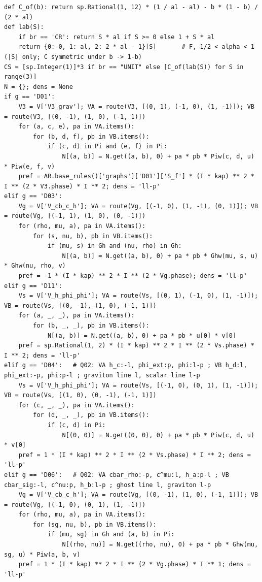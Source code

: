 \documentclass[10pt]{article}
\begin{document}
\begin{lstlisting}
def C_of(b): return sp.Rational(1, 12) * (1 / al - al) - b * (1 - b) / (2 * al)
def lab(S):
    if br == 'CR': return S * al if S >= 0 else 1 + S * al
    return {0: 0, 1: al, 2: 2 * al - 1}[S]       # F, 1/2 < alpha < 1 (|S| only; C symmetric under b -> 1-b)
CS = [sp.Integer(1)]*3 if br == "UNIT" else [C_of(lab(S)) for S in range(3)]
N = {}; dens = None
if g == 'D01':
    V3 = V['V3_grav']; VA = route(V3, [(0, 1), (-1, 0), (1, -1)]); VB = route(V3, [(0, -1), (1, 0), (-1, 1)])
    for (a, c, e), pa in VA.items():
        for (b, d, f), pb in VB.items():
            if (c, d) in Pi and (e, f) in Pi:
                N[(a, b)] = N.get((a, b), 0) + pa * pb * Piw(c, d, u) * Piw(e, f, v)
    pref = AR.base_rules()['graphs']['D01']['S_f'] * (I * kap) ** 2 * I ** (2 * V3.phase) * I ** 2; dens = 'll-p'
elif g == 'D03':
    Vg = V['V_cb_c_h']; VA = route(Vg, [(-1, 0), (1, -1), (0, 1)]); VB = route(Vg, [(-1, 1), (1, 0), (0, -1)])
    for (rho, mu, a), pa in VA.items():
        for (s, nu, b), pb in VB.items():
            if (mu, s) in Gh and (nu, rho) in Gh:
                N[(a, b)] = N.get((a, b), 0) + pa * pb * Ghw(mu, s, u) * Ghw(nu, rho, v)
    pref = -1 * (I * kap) ** 2 * I ** (2 * Vg.phase); dens = 'll-p'
elif g == 'D11':
    Vs = V['V_h_phi_phi']; VA = route(Vs, [(0, 1), (-1, 0), (1, -1)]); VB = route(Vs, [(0, -1), (1, 0), (-1, 1)])
    for (a, _, _), pa in VA.items():
        for (b, _, _), pb in VB.items():
            N[(a, b)] = N.get((a, b), 0) + pa * pb * u[0] * v[0]
    pref = sp.Rational(1, 2) * (I * kap) ** 2 * I ** (2 * Vs.phase) * I ** 2; dens = 'll-p'
elif g == 'D04':   # Q02: VA h_c:-l, phi_ext:p, phi:l-p ; VB h_d:l, phi_ext:-p, phi:p-l ; graviton line l, scalar line l-p
    Vs = V['V_h_phi_phi']; VA = route(Vs, [(-1, 0), (0, 1), (1, -1)]); VB = route(Vs, [(1, 0), (0, -1), (-1, 1)])
    for (c, _, _), pa in VA.items():
        for (d, _, _), pb in VB.items():
            if (c, d) in Pi:
                N[(0, 0)] = N.get((0, 0), 0) + pa * pb * Piw(c, d, u) * v[0]
    pref = 1 * (I * kap) ** 2 * I ** (2 * Vs.phase) * I ** 2; dens = 'll-p'
elif g == 'D06':   # Q02: VA cbar_rho:-p, c^mu:l, h_a:p-l ; VB cbar_sig:-l, c^nu:p, h_b:l-p ; ghost line l, graviton l-p
    Vg = V['V_cb_c_h']; VA = route(Vg, [(0, -1), (1, 0), (-1, 1)]); VB = route(Vg, [(-1, 0), (0, 1), (1, -1)])
    for (rho, mu, a), pa in VA.items():
        for (sg, nu, b), pb in VB.items():
            if (mu, sg) in Gh and (a, b) in Pi:
                N[(rho, nu)] = N.get((rho, nu), 0) + pa * pb * Ghw(mu, sg, u) * Piw(a, b, v)
    pref = 1 * (I * kap) ** 2 * I ** (2 * Vg.phase) * I ** 1; dens = 'll-p'

\end{lstlisting}
\end{document}
